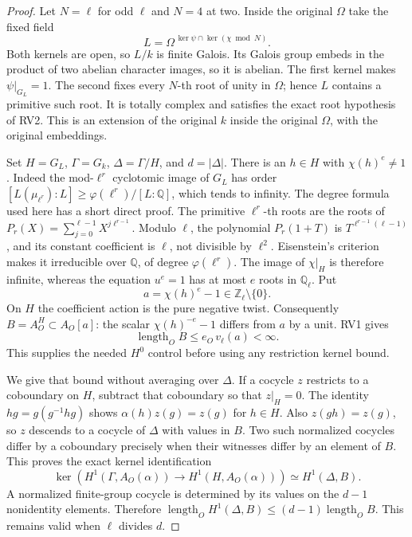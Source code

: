 \begin{proof}
Let $N=\ell$ for odd $\ell$ and $N=4$ at two.  Inside the original
$\Omega$ take the fixed field
\[
 L=\Omega^{\,\ker\psi\cap\ker(\chi\bmod N)}.
 \tag{RV.15}
\]
Both kernels are open, so $L/k$ is finite Galois.
Its Galois group embeds in the product of two abelian character
images, so it is abelian.  The first kernel makes $\psi|_{G_L}=1$.
The second fixes every $N$-th root of unity in $\Omega$; hence $L$
contains a primitive such root.  It is totally complex and satisfies
the exact root hypothesis of RV2.
This is an extension of the original $k$ inside the original
$\Omega$, with the original embeddings.

Set $H=G_L$, $\Gamma=G_k$, $\Delta=\Gamma/H$, and $d=|\Delta|$.
There is an $h\in H$ with $\chi(h)^e\ne1$.
Indeed the mod-$\ell^r$ cyclotomic image of $G_L$ has order
$[L(\mu_{\ell^r}):L]\ge
\varphi(\ell^r)/[L:\mathbb Q]$, which tends to infinity.
The degree formula used here has a short direct proof.
The primitive $\ell^r$-th roots are the roots of
$P_r(X)=\sum_{j=0}^{\ell-1}X^{j\ell^{r-1}}$.
Modulo $\ell$, the polynomial $P_r(1+T)$ is
$T^{\ell^{r-1}(\ell-1)}$, and its constant coefficient is
$\ell$, not divisible by $\ell^2$.
Eisenstein's criterion makes it irreducible over $\mathbb Q$,
of degree $\varphi(\ell^r)$.
The image of $\chi|_H$ is therefore infinite, whereas the equation
$u^e=1$ has at most $e$ roots in $\mathbb Q_\ell$.
Put
\[
                       a=\chi(h)^e-1\in\mathbb Z_\ell\setminus\{0\}.
 \tag{RV.16}
\]
On $H$ the coefficient action is the pure negative twist.
Consequently
$B=A_O^H\subset A_O[a]$: the scalar
$\chi(h)^{-e}-1$ differs from $a$ by a unit.
RV1 gives
\[
             \operatorname{length}_O B
                     \le e_O\,v_\ell(a)<\infty.
 \tag{RV.17}
\]
This supplies the needed $H^0$ control before using any restriction
kernel bound.

We give that bound without averaging over $\Delta$.
If a cocycle $z$ restricts to a coboundary on $H$, subtract that
coboundary so that $z|_H=0$.
The identity $hg=g(g^{-1}hg)$ shows
$\alpha(h)z(g)=z(g)$ for $h\in H$.
Also $z(gh)=z(g)$, so $z$ descends to a cocycle of $\Delta$
with values in $B$.
Two such normalized cocycles differ by a coboundary precisely when
their witnesses differ by an element of $B$.
This proves the exact kernel identification
\[
 \ker\!\left(H^1(\Gamma,A_O(\alpha))
                  \longrightarrow H^1(H,A_O(\alpha))\right)
                      \simeq H^1(\Delta,B).
 \tag{RV.18}
\]
A normalized finite-group cocycle is determined by its values on
the $d-1$ nonidentity elements.  Therefore
$\operatorname{length}_O H^1(\Delta,B)
\le(d-1)\operatorname{length}_O B$.
This remains valid when $\ell$ divides $d$.


\end{proof}
